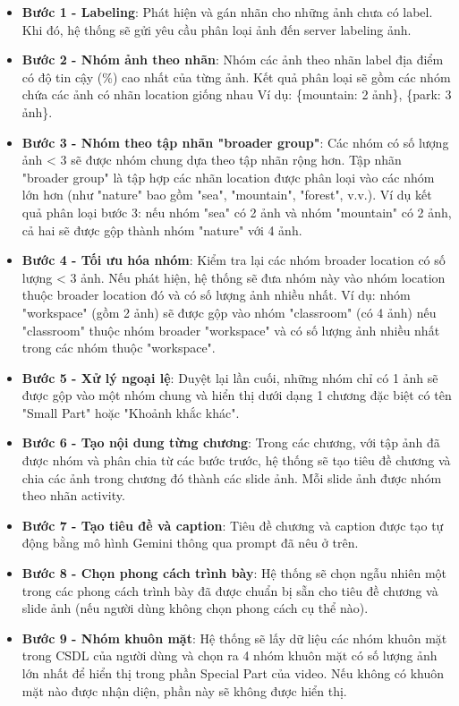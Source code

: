 \begin{itemize}
    \item \textbf{Bước 1 - Labeling}: Phát hiện và gán nhãn cho những ảnh chưa có label. Khi đó, hệ thống sẽ gửi yêu cầu phân loại ảnh đến server labeling ảnh. 
    
    \item \textbf{Bước 2 - Nhóm ảnh theo nhãn}: Nhóm các ảnh theo nhãn label địa điểm có độ tin cậy (\%) cao nhất của từng ảnh. Kết quả phân loại sẽ gồm các nhóm chứa các ảnh có nhãn location giống nhau
    Ví dụ: \{mountain: 2 ảnh\}, \{park: 3 ảnh\}.
    
    \item \textbf{Bước 3 - Nhóm theo tập nhãn "broader group"}: Các nhóm có số lượng ảnh < 3 sẽ được nhóm chung dựa theo tập nhãn rộng hơn. Tập nhãn "broader group" là tập hợp các nhãn location được phân loại vào các nhóm lớn hơn (như "nature" bao gồm "sea", "mountain", "forest", v.v.). Ví dụ kết quả phân loại bước 3: nếu nhóm "sea" có 2 ảnh và nhóm "mountain" có 2 ảnh, cả hai sẽ được gộp thành nhóm "nature" với 4 ảnh.
    
    \item \textbf{Bước 4 - Tối ưu hóa nhóm}: Kiểm tra lại các nhóm broader location có số lượng < 3 ảnh. Nếu phát hiện, hệ thống sẽ đưa nhóm này vào nhóm location thuộc broader location đó và có số lượng ảnh nhiều nhất. Ví dụ: nhóm "workspace" (gồm 2 ảnh) sẽ được gộp vào nhóm "classroom" (có 4 ảnh) nếu "classroom" thuộc nhóm broader "workspace" và có số lượng ảnh nhiều nhất trong các nhóm thuộc "workspace".
    
    \item \textbf{Bước 5 - Xử lý ngoại lệ}: Duyệt lại lần cuối, những nhóm chỉ có 1 ảnh sẽ được gộp vào một nhóm chung và hiển thị dưới dạng 1 chương đặc biệt có tên "Small Part" hoặc "Khoảnh khắc khác".
    \item \textbf{Bước 6 - Tạo nội dung từng chương}: Trong các chương, với tập ảnh đã được nhóm và phân chia từ các bước trước, hệ thống sẽ tạo tiêu đề chương và chia các ảnh trong chương đó thành các slide ảnh. Mỗi slide ảnh được nhóm theo nhãn activity. 
    \item \textbf{Bước 7 - Tạo tiêu đề và caption}: Tiêu đề chương và caption được tạo tự động bằng mô hình Gemini thông qua prompt đã nêu ở trên. 
    \item \textbf{Bước 8 - Chọn phong cách trình bày}: Hệ thống sẽ chọn ngẫu nhiên một trong các phong cách trình bày đã được chuẩn bị sẵn cho tiêu đề chương và slide ảnh (nếu người dùng không chọn phong cách cụ thể nào).
    \item \textbf{Bước 9 - Nhóm khuôn mặt}: Hệ thống sẽ lấy dữ liệu các nhóm khuôn mặt trong CSDL của người dùng và chọn ra 4 nhóm khuôn mặt có số lượng ảnh lớn nhất để hiển thị trong phần Special Part của video. Nếu không có khuôn mặt nào được nhận diện, phần này sẽ không được hiển thị.
\end{itemize}

